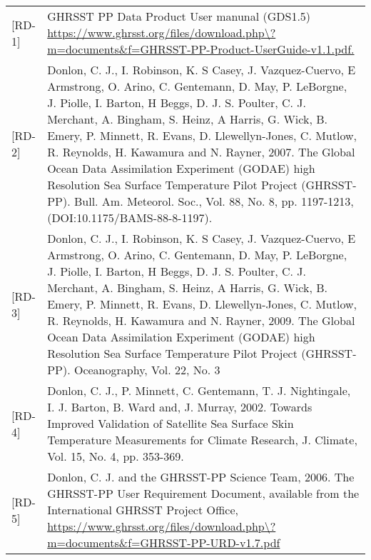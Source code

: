 \begin{tabular}{ l p{13cm} }
    [RD-1] & GHRSST PP Data Product User manunal (GDS1.5) \url{https://www.ghrsst.org/files/download.php\?m=documents\&f=GHRSST-PP-Product-UserGuide-v1.1.pdf.} \\

    [RD-2] & Donlon, C. J., I. Robinson, K. S Casey, J. Vazquez-Cuervo, E Armstrong, O. Arino, C.
    Gentemann, D. May, P. LeBorgne, J. Piolle, I. Barton, H Beggs, D. J. S. Poulter, C. J.
    Merchant, A. Bingham, S. Heinz, A Harris, G. Wick, B. Emery, P. Minnett, R. Evans, D.
    Llewellyn-Jones, C. Mutlow, R. Reynolds, H. Kawamura and N. Rayner, 2007. The Global
    Ocean Data Assimilation Experiment (GODAE) high Resolution Sea Surface Temperature
    Pilot Project (GHRSST-PP). Bull. Am. Meteorol. Soc., Vol. 88, No. 8, pp. 1197-1213,
    (DOI:10.1175/BAMS-88-8-1197). \\

    [RD-3] & Donlon, C. J., I. Robinson, K. S Casey, J. Vazquez-Cuervo, E Armstrong, O. Arino, C.
    Gentemann, D. May, P. LeBorgne, J. Piolle, I. Barton, H Beggs, D. J. S. Poulter, C. J.
    Merchant, A. Bingham, S. Heinz, A Harris, G. Wick, B. Emery, P. Minnett, R. Evans, D.
    Llewellyn-Jones, C. Mutlow, R. Reynolds, H. Kawamura and N. Rayner, 2009. The Global
    Ocean Data Assimilation Experiment (GODAE) high Resolution Sea Surface Temperature
    Pilot Project (GHRSST-PP). Oceanography, Vol. 22, No. 3 \\

    [RD-4] & Donlon, C. J., P. Minnett, C. Gentemann, T. J. Nightingale, I. J. Barton, B. Ward and, J.
    Murray, 2002. Towards Improved Validation of Satellite Sea Surface Skin Temperature
    Measurements for Climate Research, J. Climate, Vol. 15, No. 4, pp. 353-369. \\

    [RD-5] & Donlon, C. J. and the GHRSST-PP Science Team, 2006. The GHRSST-PP User Requirement Document, available from the International GHRSST Project Office, \url{https://www.ghrsst.org/files/download.php\?m=documents\&f=GHRSST-PP-URD-v1.7.pdf} \\
\end{tabular}